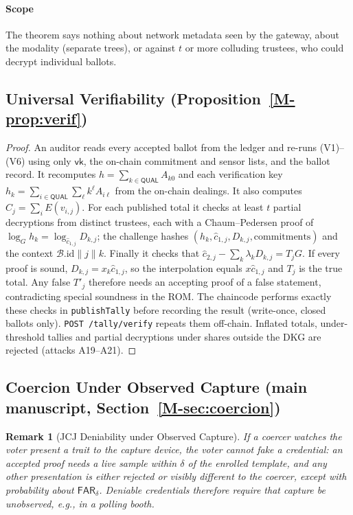 \documentclass[10pt,letterpaper,journal]{IEEEtran}
\newtheorem{remark}[theorem]{Remark}
\begin{document}
\paragraph{Scope} The theorem says nothing about network metadata seen by the gateway, about the modality (separate trees), or against $t$ or more colluding trustees, who could decrypt individual ballots.

\subsection{Universal Verifiability (Proposition~\ref{M-prop:verif})}
\label{sec:supp-proof-verifiability}

\begin{proof}
An auditor reads every accepted ballot from the ledger and re-runs (V1)--(V6) using only $\mathsf{vk}$, the on-chain commitment and sensor lists, and the ballot record. It recomputes $h = \sum_{k\in\mathsf{QUAL}} A_{k0}$ and each verification key $h_k = \sum_{i\in\mathsf{QUAL}}\sum_\ell k^\ell A_{i\ell}$ from the on-chain dealings. It also computes $\hat{C}_j = \sum_i E(v_{i,j})$. For each published total it checks at least $t$ partial decryptions from distinct trustees, each with a Chaum--Pedersen proof of $\log_G h_k = \log_{\hat{c}_{1,j}} D_{k,j}$; the challenge hashes $(h_k, \hat{c}_{1,j}, D_{k,j}, \text{commitments})$ and the context $\mathcal{B}.\mathrm{id}\|j\|k$. Finally it checks that $\hat{c}_{2,j} - \sum_k \lambda_k D_{k,j} = T_jG$. If every proof is sound, $D_{k,j} = x_k\hat{c}_{1,j}$, so the interpolation equals $x\hat{c}_{1,j}$ and $T_j$ is the true total. Any false $T'_j$ therefore needs an accepting proof of a false statement, contradicting special soundness in the ROM. The chaincode performs exactly these checks in \texttt{publishTally} before recording the result (write-once, closed ballots only). \texttt{POST /tally/verify} repeats them off-chain. Inflated totals, under-threshold tallies and partial decryptions under shares outside the DKG are rejected (attacks A19--A21).
\end{proof}

\subsection{Coercion Under Observed Capture (main manuscript, Section~\ref{M-sec:coercion})}
\label{sec:supp-proof-coercion}

\begin{remark}[JCJ Deniability under Observed Capture]
\label{prop:coercion-impossibility}
If a coercer watches the voter present a trait to the capture device, the voter cannot fake a credential: an accepted proof needs a live sample within $\delta$ of the enrolled template, and any other presentation is either rejected or visibly different to the coercer, except with probability about $\mathsf{FAR}_\delta$. Deniable credentials therefore require that capture be unobserved, e.g., in a polling booth.
\end{remark}
\end{document}
